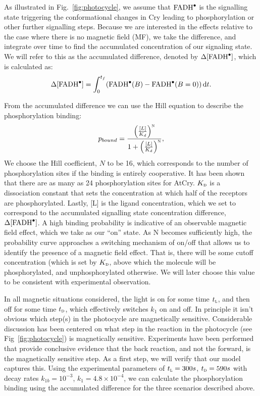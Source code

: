 \documentclass[twoside,twocolumn,9pt]{article}
\begin{document}
As illustrated in Fig.~\ref{fig:photocycle}, we assume that $\ce{FADH^{.}}$ is the signalling state triggering the conformational
changes in Cry leading to phosphorylation or other further signalling steps. Because we are interested in the effects relative to
the case where there is no magnetic field (MF), we take the difference, and integrate over time to find the accumulated
concentration of our signaling state. We will refer to this as the accumulated difference, denoted by $\Delta [\ce{FADH^{.}}]$,
which is calculated as:
\begin{equation}
	\Delta [\ce{FADH^{.}}] = \int_{0}^{t_{f}} (\ce{FADH^{.}}(B) - \ce{FADH^{.}}(B = 0)) \, \mathrm{d}t.
\end{equation}

From the accumulated difference we can use the Hill equation to describe the phosphorylation binding: \cite{Phillips2009}
\begin{equation}
	p_{bound} = \frac{\left( \frac{[L]}{K_{d}} \right)^{\textsc{n}}}{1 + \left( \frac{[L]}{K_{d}} \right)^{\textsc{n}}},
	\label{eq:phosph}
\end{equation}
We choose the Hill coefficient, $N$ to be 16, which corresponds to the number of phosphorylation sites if the binding is entirely
cooperative. \cite{Phillips2009} It has been shown \cite{Liu2017} that there are as many as 24 phosphorylation sites for AtCry.
$K_{\textsc{d}}$ is a dissociation constant that sets the concentration at which half of the receptors are phosphorylated. Lastly,
[L] is the ligand concentration, which we set to correspond to the accumulated signalling state concentration difference, $\Delta
[\ce{FADH^{.}}]$. A high binding probability is indicative of an observable magnetic field effect, which we take as our ``on''
state.
As N becomes sufficiently high, the probability curve approaches a switching mechanism of on/off that allows us to identify the
presence of a magnetic field effect. That is, there will be some cutoff concentration (which is set by $K_{\textsc{d}}$, above which
the molecule will be phosphorylated, and unphosphorylated otherwise. We will later choose this value to be consistent with
experimental observation.

In all magnetic situations considered, the light is on for some time $t_{\textsc{l}}$, and then off for some time $t_{\textsc{d}}$,
which effectively switches $k_{1}$ on and off. In principle it isn't obvious which step(s) in the photocycle are magnetically
sensitive. Considerable discussion has been centered on what step in the reaction in the photocycle (see Fig~\ref{fig:photocycle})
is magnetically sensitive. Experiments have been performed that provide conclusive evidence that the back reaction, and not the
forward, is the magnetically sensitive step. As a first step, we will verify that our model captures this. Using the experimental
parameters \cite{Pooam2019} of $t_{\textsc{l}} = 300s$, $t_{\textsc{d}} = 590s$ with decay rates $k_{1b} = 10^{-3}$, $k_{1} = 4.8
\times 10^{-4}$, \cite{Procopio2016} we can calculate the phosphorylation binding using the accumulated difference for the three
scenarios described above.
\end{document}
